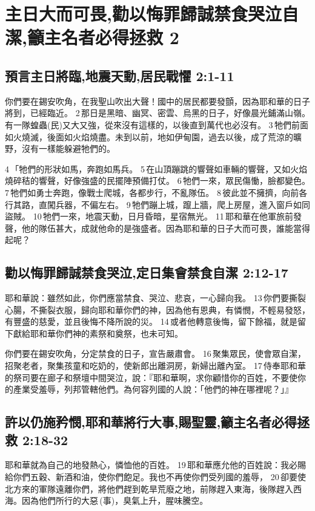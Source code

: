 \section{主日大而可畏,勸以悔罪歸誠禁食哭泣自潔,籲主名者必得拯救 2}
\subsection{預言主日將臨,地震天動,居民戰懼 2:1-11}
你們要在錫安吹角，在我聖山吹出大聲！國中的居民都要發顫，因為耶和華的日子將到，已經臨近。 2 那日是黑暗、幽冥、密雲、烏黑的日子，好像晨光鋪滿山嶺。有一隊蝗蟲(民)又大又強，從來沒有這樣的，以後直到萬代也必沒有。 3 牠們前面如火燒滅，後面如火焰燒盡。未到以前，地如伊甸園，過去以後，成了荒涼的曠野，沒有一樣能躲避牠們的。

4 「牠們的形狀如馬，奔跑如馬兵。 5 在山頂蹦跳的響聲如車輛的響聲，又如火焰燒碎秸的響聲，好像強盛的民擺陣預備打仗。 6 牠們一來，眾民傷慟，臉都變色。 7 牠們如勇士奔跑，像戰士爬城，各都步行，不亂隊伍。 8 彼此並不擁擠，向前各行其路，直闖兵器，不偏左右。 9 牠們蹦上城，躥上牆，爬上房屋，進入窗戶如同盜賊。 10 牠們一來，地震天動，日月昏暗，星宿無光。 11 耶和華在他軍旅前發聲，他的隊伍甚大，成就他命的是強盛者。因為耶和華的日子大而可畏，誰能當得起呢？

\subsection{勸以悔罪歸誠禁食哭泣,定日集會禁食自潔 2:12-17}
耶和華說：雖然如此，你們應當禁食、哭泣、悲哀，一心歸向我。 13 你們要撕裂心腸，不撕裂衣服，歸向耶和華你們的神，因為他有恩典，有憐憫，不輕易發怒，有豐盛的慈愛，並且後悔不降所說的災。 14 或者他轉意後悔，留下餘福，就是留下獻給耶和華你們神的素祭和奠祭，也未可知。

你們要在錫安吹角，分定禁食的日子，宣告嚴肅會。 16 聚集眾民，使會眾自潔，招聚老者，聚集孩童和吃奶的，使新郎出離洞房，新婦出離內室。 17 侍奉耶和華的祭司要在廊子和祭壇中間哭泣，說：『耶和華啊，求你顧惜你的百姓，不要使你的產業受羞辱，列邦管轄他們。為何容列國的人說：「他們的神在哪裡呢？」』

\subsection{許以仍施矜憫,耶和華將行大事,賜聖靈,籲主名者必得拯救 2:18-32}
耶和華就為自己的地發熱心，憐恤他的百姓。 19 耶和華應允他的百姓說：我必賜給你們五穀、新酒和油，使你們飽足。我也不再使你們受列國的羞辱， 20 卻要使北方來的軍隊遠離你們，將他們趕到乾旱荒廢之地，前隊趕入東海，後隊趕入西海。因為他們所行的大惡 (事)，臭氣上升，腥味騰空。

